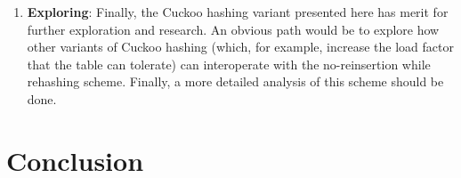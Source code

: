 \begin{enumerate}
\item \textbf{Exploring}: Finally, the Cuckoo hashing variant presented here has
merit for further exploration and research. An obvious path would be to explore
how other variants of Cuckoo hashing (which, for example, increase the load factor that
the table can tolerate) can interoperate with the no-reinsertion while rehashing
scheme. Finally, a more detailed analysis of this scheme should be done.

\end{enumerate}

\section{Conclusion}

